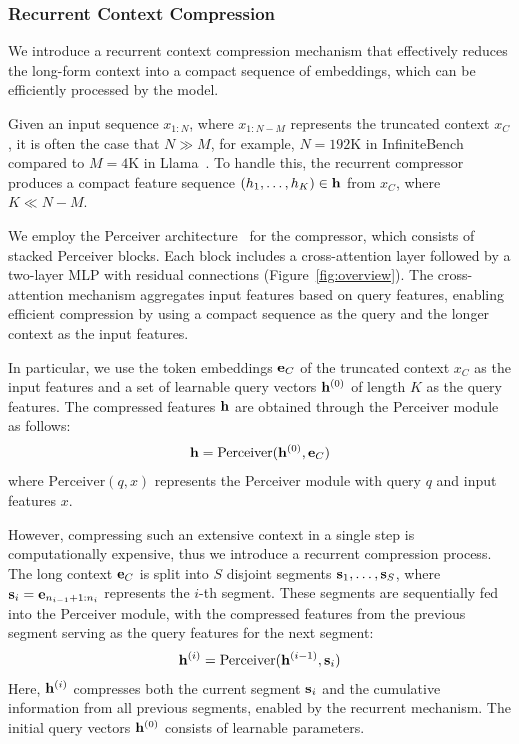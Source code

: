 \subsubsection{Recurrent Context Compression}
\label{subsubsection:RCC}
We introduce a recurrent context compression mechanism that effectively reduces the long-form context into a compact sequence of embeddings, which can be efficiently processed by the model.

Given an input sequence $x_{1:N}$, where $x_{1:N-M}$ represents the truncated context $x_C$, it is often the case that $N \gg M$, for example, $N = 192\mathrm{K}$ in InfiniteBench~\cite{infinitebench} compared to $M = 4\mathrm{K}$ in Llama~\cite{llama2}. To handle this, the recurrent compressor produces a compact feature sequence $(h_1, \dots, h_K) \in \mathbf{h}$ from $x_C$, where $K \ll N-M$.

We employ the Perceiver architecture~\cite{perceiver, perceiverio} for the compressor, which consists of stacked Perceiver blocks. Each block includes a cross-attention layer followed by a two-layer MLP with residual connections (Figure~\ref{fig:overview}). The cross-attention mechanism aggregates input features based on query features, enabling efficient compression by using a compact sequence as the query and the longer context as the input features.

In particular, we use the token embeddings $\mathbf{e}_C$ of the truncated context $x_C$ as the input features and a set of learnable query vectors $\mathbf{h}^{(0)}$ of length $K$ as the query features. The compressed features $\mathbf{h}$ are obtained through the Perceiver module as follows:
\begin{align}
    \mathbf{h} = \mathrm{Perceiver}(\mathbf{h}^{(0)}, \mathbf{e}_C)
\end{align}
where $\mathrm{Perceiver}(q, x)$ represents the Perceiver module with query $q$ and input features $x$.

However, compressing such an extensive context in a single step is computationally expensive, thus we introduce a recurrent compression process. The long context $\mathbf{e}_C$ is split into $S$ disjoint segments $\mathbf{s}_1, \dots, \mathbf{s}_S$, where $\mathbf{s}_i = \mathbf{e}_{n_{i-1}+1:n_i}$ represents the $i$-th segment. These segments are sequentially fed into the Perceiver module, with the compressed features from the previous segment serving as the query features for the next segment:
\begin{align}
    \mathbf{h}^{(i)} = \mathrm{Perceiver}(\mathbf{h}^{(i-1)}, \mathbf{s}_i)
    \label{eq:vanillaRCC}
\end{align}
Here, $\mathbf{h}^{(i)}$ compresses both the current segment $\mathbf{s}_i$ and the cumulative information from all previous segments, enabled by the recurrent mechanism. The initial query vectors $\mathbf{h}^{(0)}$ consists of learnable parameters.


